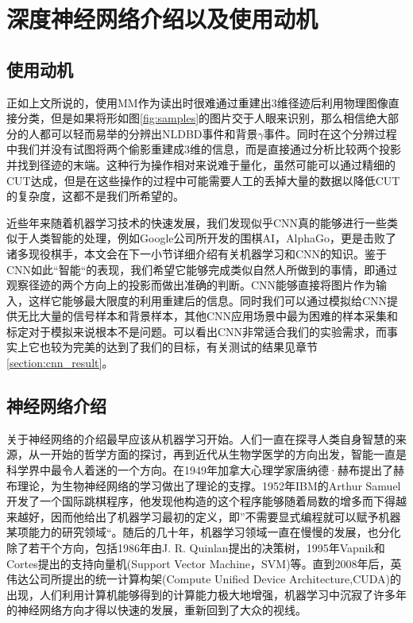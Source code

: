 \section{深度神经网络介绍以及使用动机}

\subsection{使用动机}
正如上文所说的，使用MM作为读出时很难通过重建出3维径迹后利用物理图像直接分类，但是如果将形如图\ref{fig:samples}的图片交于人眼来识别，那么相信绝大部分的人都可以轻而易举的分辨出NLDBD事件和背景$\gamma$事件。同时在这个分辨过程中我们并没有试图将两个偷影重建成3维的信息，而是直接通过分析比较两个投影并找到径迹的末端。这种行为操作相对来说难于量化，虽然可能可以通过精细的CUT达成，但是在这些操作的过程中可能需要人工的丢掉大量的数据以降低CUT的复杂度，这都不是我们所希望的。

近些年来随着机器学习技术的快速发展，我们发现似乎CNN真的能够进行一些类似于人类智能的处理，例如Google公司所开发的围棋AI，AlphaGo\supercite{gibney2016google}，更是击败了诸多现役棋手，本文会在下一小节详细介绍有关机器学习和CNN的知识。鉴于CNN如此“智能“的表现，我们希望它能够完成类似自然人所做到的事情，即通过观察径迹的两个方向上的投影而做出准确的判断。CNN能够直接将图片作为输入，这样它能够最大限度的利用重建后的信息。同时我们可以通过模拟给CNN提供无比大量的信号样本和背景样本，其他CNN应用场景中最为困难的样本采集和标定对于模拟来说根本不是问题。可以看出CNN非常适合我们的实验需求，而事实上它也较为完美的达到了我们的目标，有关测试的结果见章节\ref{section:cnn_result}。

\subsection{神经网络介绍}

关于神经网络的介绍最早应该从机器学习开始。人们一直在探寻人类自身智慧的来源，从一开始的哲学方面的探讨，再到近代从生物学医学的方向出发，智能一直是科学界中最令人着迷的一个方向。在1949年加拿大心理学家唐纳德·赫布提出了赫布理论\supercite{hebbian}，为生物神经网络的学习做出了理论的支撑。1952年IBM的Arthur Samuel开发了一个国际跳棋程序，他发现他构造的这个程序能够随着局数的增多而下得越来越好，因而他给出了机器学习最初的定义，即”不需要显式编程就可以赋予机器某项能力的研究领域“。随后的几十年，机器学习领域一直在慢慢的发展，也分化除了若干个方向，包括1986年由J. R. Quinlan提出的决策树，1995年Vapnik和Cortes提出的支持向量机(Support Vector Machine，SVM)等\supercite{mlhistory}。直到2008年后，英伟达公司所提出的统一计算构架(Compute Unified Device Architecture,CUDA)\supercite{CUDA}的出现，人们利用计算机能够得到的计算能力极大地增强，机器学习中沉寂了许多年的神经网络方向才得以快速的发展，重新回到了大众的视线。

